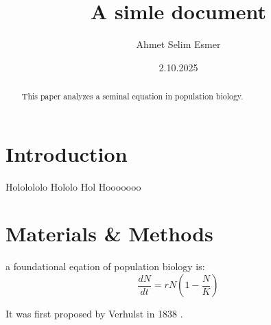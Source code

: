 \documentclass[12pt]{article}
\title{A simle document}
\author{Ahmet Selim Esmer}
\date{2.10.2025}
\begin{document}
\maketitle 

\begin{abstract}
This paper analyzes a seminal equation in population biology.
\end{abstract}

\section{Introduction}
Hololololo Hololo Hol Hooooooo

\section{Materials \& Methods}

a foundational eqation of population biology is:
\begin{equation}
    \frac{dN}{dt} = r N (1 - \frac{N}{K} )
\end{equation}

It was first proposed by Verhulst in 1838 \cite{verhulst1838notice}.



\end{document}
